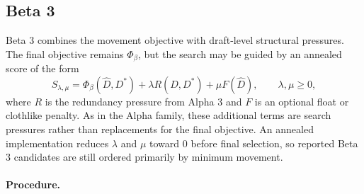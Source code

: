 \documentclass[11pt]{article}
\begin{document}
\subsection{Beta 3}

Beta 3 combines the movement objective with draft-level structural pressures.
The final objective remains \(\Phi_\beta\), but the search may be guided by an
annealed score of the form
\[
  S_{\lambda,\mu}
  =
  \Phi_\beta(\widehat{D},D^\ast)
  +
  \lambda R(D,D^\ast)
  +
  \mu F(\widehat{D}),
  \qquad
  \lambda,\mu\ge 0,
\]
where \(R\) is the redundancy pressure from Alpha 3 and \(F\) is an optional
float or clothlike penalty. As in the Alpha family, these additional terms are
search pressures rather than replacements for the final objective. An annealed
implementation reduces \(\lambda\) and \(\mu\) toward \(0\) before final
selection, so reported Beta 3 candidates are still ordered primarily by minimum
movement.

\paragraph{Procedure.}
\end{document}

